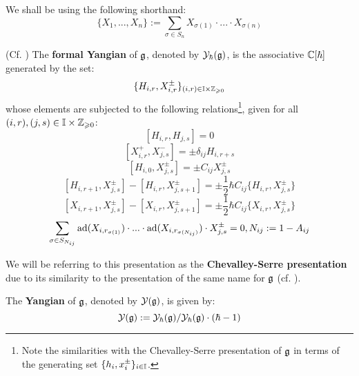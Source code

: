         \begin{convention}
            We shall be using the following shorthand:
                $$\{ X_1, ..., X_n \} := \sum_{\sigma \in S_n} X_{\sigma(1)} \cdot ... \cdot X_{\sigma(n)}$$
        \end{convention}
        \begin{definition} \label{def: formal_finite_type_yangians}
            (Cf. \cite[Definition 2.1]{guay_nakajima_wendlandt_affine_yangian_coproduct}) The \textbf{formal Yangian} of $\mathfrak{g}$, denoted by $\mathcal{Y}_{\hbar}(\mathfrak{g})$, is the associative $\mathbb{C}[\hbar]$ generated by the set:
                $$\{ H_{i, r}, X_{i, r}^{\pm} \}_{(i, r) \in \simpleroots \x \Z_{\geq 0}}$$
            whose elements are subjected to the following relations\footnote{Note the similarities with the Chevalley-Serre presentation of $\mathfrak{g}$ in terms of the generating set $\{ h_i, x_i^{\pm} \}_{i \in \mathbb{I}}$.}, given for all $(i, r), (j, s) \in \simpleroots \x \Z_{\geq 0}$:
                $$[ H_{i, r}, H_{j, s} ] = 0$$
                $$[ X_{i, r}^+, X_{j, s}^- ] = \pm \delta_{ij} H_{i, r + s}$$
                $$[ H_{i, 0}, X_{j, s}^{\pm} ] = \pm C_{ij} X_{j, s}^{\pm}$$
                $$[ H_{i, r + 1}, X_{j, s}^{\pm} ] - [ H_{i, r}, X_{j, s + 1}^{\pm} ] = \pm \frac12 \hbar C_{ij} \{H_{i, r}, X_{j, s}^{\pm}\}$$
                $$[ X_{i, r + 1}, X_{j, s}^{\pm} ] - [ X_{i, r}, X_{j, s + 1}^{\pm} ] = \pm \frac12 \hbar C_{ij} \{X_{i, r}, X_{j, s}^{\pm}\}$$
                $$\sum_{\sigma \in S_{N_{ij}}} \mathrm{ad}(X_{i, r_{\sigma(1)}}) \cdot ... \cdot \mathrm{ad}(X_{i, r_{\sigma(N_{ij})}}) \cdot X_{j, s}^{\pm} = 0, N_{ij} := 1 - A_{ij}$$
                
            We will be referring to this presentation as the \textbf{Chevalley-Serre presentation} due to its similarity to the presentation of the same name for $\mathfrak{g}$ (cf. \cite[Section 8]{humphreys_lie_algebras}). 
        \end{definition}
        \begin{definition}[Yangians] \label{def: finite_type_yangians}
            The \textbf{Yangian} of $\mathfrak{g}$, denoted by $\mathcal{Y}(\mathfrak{g})$, is given by:
                $$\mathcal{Y}(\mathfrak{g}) := \mathcal{Y}_{\hbar}(\mathfrak{g})/\mathcal{Y}_{\hbar}(\mathfrak{g}) \cdot (\hbar - 1)$$
        \end{definition}
